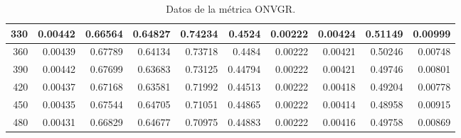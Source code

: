 \begin{table}[h]
\begin{tabular}{|r|r|r|r|r|r|r|r|r|r|}
			\hline \tiny 330 &{\tiny 0.00442}	&{\tiny 0.66564}	&{\tiny 0.64827}	&{\tiny 0.74234}	&{\tiny 0.4524}	&{\tiny 0.00222}	&{\tiny 0.00424}	&{\tiny 0.51149}	&{\tiny 0.00999} \\
			\hline \tiny 360 &{\tiny 0.00439}	&{\tiny 0.67789}	&{\tiny 0.64134}	&{\tiny 0.73718}	&{\tiny 0.4484}	&{\tiny 0.00222}	&{\tiny 0.00421}	&{\tiny 0.50246}	&{\tiny 0.00748} \\
			\hline \tiny 390 &{\tiny 0.00442}	&{\tiny 0.67699}	&{\tiny 0.63683}	&{\tiny 0.73125}	&{\tiny 0.44794}	&{\tiny 0.00222}	&{\tiny 0.00421}	&{\tiny 0.49746}	&{\tiny 0.00801} \\
			\hline \tiny 420 &{\tiny 0.00437}	&{\tiny 0.67168}	&{\tiny 0.63581}	&{\tiny 0.71992}	&{\tiny 0.44513}	&{\tiny 0.00222}	&{\tiny 0.00418}	&{\tiny 0.49204}	&{\tiny 0.00778} \\
			\hline \tiny 450 &{\tiny 0.00435}	&{\tiny 0.67544}	&{\tiny 0.64705}	&{\tiny 0.71051}	&{\tiny 0.44865}	&{\tiny 0.00222}	&{\tiny 0.00414}	&{\tiny 0.48958}	&{\tiny 0.00915} \\
			\hline \tiny 480 &{\tiny 0.00431}	&{\tiny 0.66829}	&{\tiny 0.64677}	&{\tiny 0.70975}	&{\tiny 0.44883}	&{\tiny 0.00222}	&{\tiny 0.00416}	&{\tiny 0.49758}	&{\tiny 0.00869} \\						
			\hline								
		\end{tabular}
	 \caption{Datos de la m\'etrica ONVGR.}
   \label{tabA6}	
\end{table}


